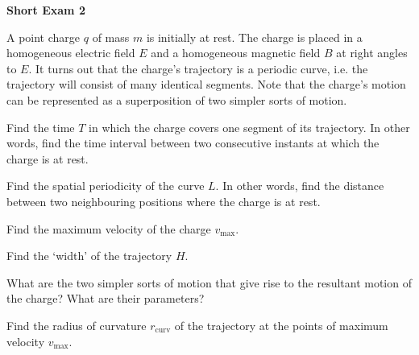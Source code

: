 \documentclass[../TST.tex]{subfiles}
\begin{document}
\begin{large}
	\textbf{Short Exam 2}
\end{large}

\begin{sproblem}
A point charge $q$ of mass $m$ is initially at rest. The charge is placed in a homogeneous electric field $E$ and a homogeneous magnetic field $B$ at right angles to $E$. It turns out that the charge's trajectory is a periodic curve, i.e. the trajectory will consist of many identical segments. Note that the charge's motion can be represented as a superposition of two simpler sorts of motion.
\begin{subpart}
	\item Find the time $T$ in which the charge covers one segment of its trajectory. In other words, find the time interval between two consecutive instants at which the charge is at rest. 
	\item Find the spatial periodicity of the curve $L$. In other words, find the distance between two neighbouring positions where the charge is at rest.
	\item Find the maximum velocity of the charge $v_\mathrm{max}$.
	\item Find the `width' of the trajectory $H$.
	\item What are the two simpler sorts of motion that give rise to the resultant motion of the charge? What are their parameters?
	\item Find the radius of curvature $r_\mathrm{curv}$ of the trajectory at the points of maximum velocity $v_\mathrm{max}$.
\end{subpart}
\end{sproblem}
\end{document}

